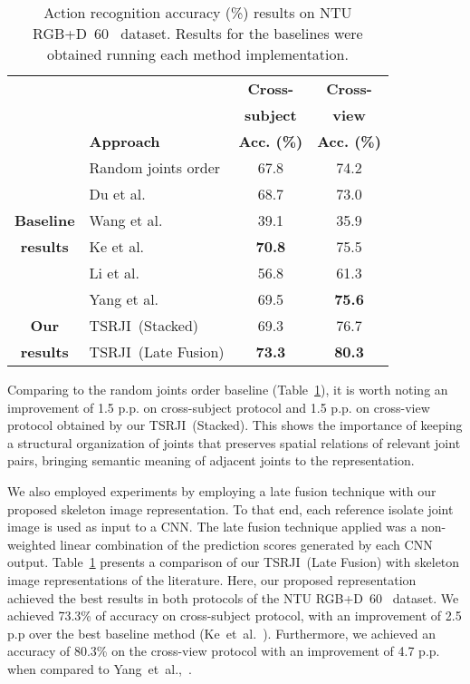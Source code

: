 \documentclass[10pt,conference]{IEEEtran}
\def\sigla{TSRJI}
\begin{document}
\begin{table}[t]
	\centering
	\begin{small}
		\caption{Action recognition accuracy (\%) results on NTU RGB+D~60~\cite{Shahroudy:2016} dataset. Results for the baselines were obtained running each method implementation.}
		\begin{tabular}{clcc}
			\toprule
			& & \multicolumn{1}{c}{\textbf{Cross-}} & \multicolumn{1}{c}{\textbf{Cross-}} \\
			& & \multicolumn{1}{c}{\textbf{subject}} & \multicolumn{1}{c}{\textbf{view}} \\
			& \textbf{Approach} & \multicolumn{1}{c}{\textbf{Acc. (\%)}} & \multicolumn{1}{c}{\textbf{Acc. (\%)}} \\
			\toprule
			& Random joints order & 67.8 & 74.2 \\
			& Du et al.~\cite{Du:2015} & 68.7 & 73.0 \\
			\multirow{1}{*}{\textbf{Baseline}} & Wang et al.~\cite{Wang:2016} & 39.1 & 35.9 \\ 
			\multirow{1}{*}{\textbf{results}} & Ke et al.~\cite{Ke:2017} & \textbf{70.8} & 75.5 \\
& Li et al.~\cite{Li:2018} & 56.8 & 61.3 \\
			& Yang et al.~\cite{Yang:2018} & 69.5 & \textbf{75.6} \\
			\midrule
\multirow{1}{*}{\textbf{Our}} & \sigla~(Stacked) & 69.3 & 76.7 \\
\multirow{1}{*}{\textbf{results}} & \sigla~(Late Fusion) & \textbf{73.3} & \textbf{80.3} \\ \bottomrule
		\end{tabular}
		\label{tab:baseline-comparison}
	\end{small}
\end{table}

Comparing to the random joints order baseline (Table~\ref{tab:baseline-comparison}), it is worth noting an improvement of 1.5 p.p. on cross-subject protocol and 1.5 p.p. on cross-view protocol obtained by our \sigla~(Stacked). This shows the importance of keeping a structural organization of joints that preserves spatial relations of relevant joint pairs, bringing semantic meaning of adjacent joints to the representation.

We also employed experiments by employing a late fusion technique with our proposed skeleton image representation. To that end, each reference isolate joint image  is used as input to a CNN. The late fusion technique applied was a non-weighted linear combination of the prediction scores generated by each CNN output. Table~\ref{tab:baseline-comparison} presents a comparison of our \sigla~(Late Fusion) with skeleton image representations of the literature. Here, our proposed representation achieved the best results in both protocols of the NTU RGB+D~60~\cite{Shahroudy:2016} dataset. We achieved 73.3\% of accuracy on cross-subject protocol, with an improvement of 2.5 p.p over the best baseline method (Ke~et~al.~\cite{Ke:2017}). Furthermore, we achieved an accuracy of 80.3\% on the cross-view protocol with an improvement of 4.7 p.p. when compared to Yang~et~al.,~\cite{Yang:2018}.
\end{document}
